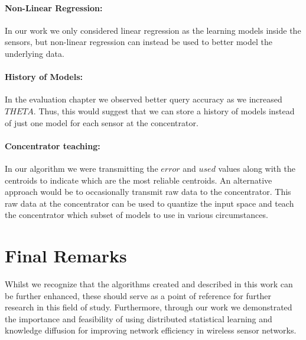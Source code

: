 \documentclass{mproj}
\begin{document}
\paragraph{Non-Linear Regression:}In our work we only considered linear regression as the learning models inside the sensors, but non-linear regression can instead be used to better model the underlying data. 
\paragraph{History of Models:}In the evaluation chapter we observed better query accuracy as we increased $THETA$. Thus, this would suggest that we can store a history of models instead of just one model for each sensor at the concentrator.
\paragraph{Concentrator teaching:}In our algorithm we were transmitting the $error$ and $used$ values along with the centroids to indicate which are the most reliable centroids. An alternative approach would be to occasionally transmit raw data to the concentrator. This raw data at the concentrator can be used to quantize the input space and teach the concentrator which subset of models to use in various circumstances.

\section{Final Remarks}
Whilst we recognize that the algorithms created and described in this work can be further enhanced, these should serve as a point of reference for further research in this field of study. Furthermore, through our work we demonstrated the importance and feasibility of using distributed statistical learning and knowledge diffusion for improving network efficiency in wireless sensor networks.



\end{document}
